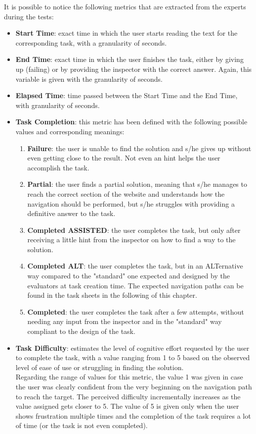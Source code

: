 \clearpage
It is possible to notice the following metrics that are extracted from the experts during the tests:
\begin{itemize}
	\item \textbf{Start Time}: exact time in which the user starts reading the text for the corresponding task, with a granularity of seconds.
	\item \textbf{End Time}: exact time in which the user finishes the task, either by giving up (failing) or by providing the inspector with the correct answer. Again, this variable is given with the granularity of seconds.
	\item \textbf{Elapsed Time}: time passed between the Start Time and the End Time, with granularity of seconds.
	\item \textbf{Task Completion}: this metric has been defined with the following possible values and corresponding meanings:
		\begin{enumerate}
			\item \textbf{Failure}: the user is unable to find the solution and s/he gives up without even getting close to the result. Not even an hint helps the user accomplish the task.
			\item \textbf{Partial}: the user finds a partial solution, meaning that s/he manages to reach the correct section of the website and understands how the navigation should be performed, but s/he struggles with providing a definitive answer to the task.
			\item \textbf{Completed ASSISTED}: the user completes the task, but only after receiving a little hint from the inspector on how to find a way to the solution.
			\item \textbf{Completed ALT}: the user completes the task, but in an ALTernative way compared to the "standard" one expected and designed by the evaluators at task creation time. The expected navigation paths can be found in the task sheets in the following of this chapter.
			\item \textbf{Completed}: the user completes the task after a few attempts, without needing any input from the inspector and in the "standard" way compliant to the design of the task.
		\end{enumerate}
	\item \textbf{Task Difficulty}: estimates the level of cognitive effort requested by the user to complete the task, with a value ranging from 1 to 5 based on the observed level of ease of use or struggling in finding the solution. \\ Regarding the range of values for this metric, the value 1 was given in case the user was clearly confident from the very beginning on the navigation path to reach the target. The perceived difficulty incrementally increases as the value assigned gets closer to 5. The value of 5 is given only when the user shows frustration multiple times and the completion of the task requires a lot of time (or the task is not even completed).
\end{itemize}

